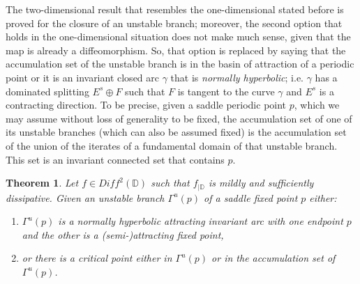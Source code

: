 \documentclass[a4paper,11pt]{article}
\newtheorem{theorem}{Theorem}
\theoremstyle{definition}
\def\DD{{\mathbb D}}
\def\ga{\gamma}
\def\Ga{\Gamma}
\def\Ga{\Gamma}
\begin{document}
The two-dimensional result that resembles the one-dimensional stated before  is proved for the closure of an unstable branch; moreover, the second option that holds in the one-dimensional situation does not make much sense, given that the map is already a diffeomorphism. So, that option is replaced by saying that the accumulation set  of the unstable branch is in the basin of attraction of a periodic point or it is an invariant closed arc $\ga$ that is {\it normally hyperbolic}; i.e. $\ga$ has a dominated splitting $E^s\oplus F$ such that $F$ is tangent to the curve $\ga$ and $E^s$ is a contracting direction. To be precise, given a saddle periodic point $p$, which we may assume without loss of generality to be fixed,  the accumulation set of one of its unstable branches (which can also be assumed fixed) is the accumulation set of the union of the iterates of a fundamental domain of that unstable branch. This set is an invariant connected set that contains $p$.





 \begin{theorem}\label{disk2} Let $f\in Diff^2(\DD)$ such that $f_{|\DD}$ is mildly and sufficiently dissipative. Given an unstable branch  $\Ga^u(p)$ of a saddle fixed point $p$ either:

\begin{enumerate}
   


\item[--]  $\Ga^u(p)$ is a normally hyperbolic attracting  invariant arc with one endpoint $p$ and the other is a (semi-)attracting fixed point, 

 \item[--] or there is a critical point either in  $\Ga^u(p)$ or in the accumulation set of $\Ga^u(p)$.
    

    \end{enumerate}

    
    
    


 
\end{theorem}
\end{document}
